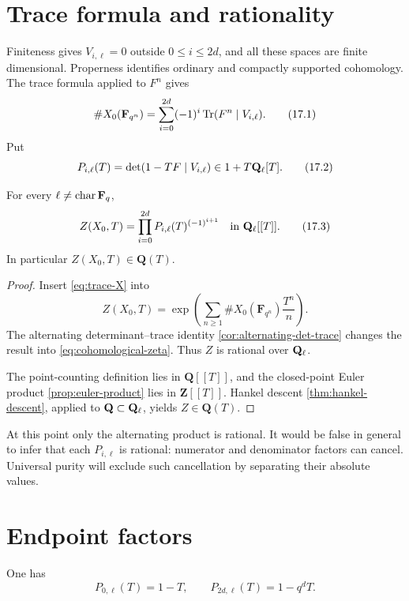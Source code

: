 \section{Trace formula and rationality}

Finiteness gives \(V_{i,\ell}=0\) outside \(0\leq i\leq2d\), and all these
spaces are finite dimensional.  Properness identifies ordinary and
compactly supported cohomology.  The trace formula applied to \(F^n\) gives
\[
  \#X_0(\mathbf F_{q^n})
  =
  \sum_{i=0}^{2d}(-1)^i
  \operatorname{Tr}(F^n\mid V_{i,\ell}).
\tag{17.1}\label{eq:trace-X}
\]
Put
\[
  P_{i,\ell}(T)=\det(1-TF\mid V_{i,\ell})
  \in1+T\mathbf Q_\ell[T].
\tag{17.2}\label{eq:Pi-definition}
\]

\begin{theorem}
\label{thm:cohomological-rationality}
For every \(\ell\ne\operatorname{char}\mathbf F_q\),
\[
  Z(X_0,T)
  =
  \prod_{i=0}^{2d}P_{i,\ell}(T)^{(-1)^{i+1}}
  \quad\text{in }\mathbf Q_\ell[[T]].
\tag{17.3}\label{eq:cohomological-zeta}
\]
In particular \(Z(X_0,T)\in\mathbf Q(T)\).
\end{theorem}

\begin{proof}
Insert \eqref{eq:trace-X} into
\[
 Z(X_0,T)=
 \exp\!\left(\sum_{n\geq1}
 \#X_0(\mathbf F_{q^n})\frac{T^n}{n}\right).
\]
The alternating determinant--trace identity
\cref{cor:alternating-det-trace} changes the result into
\eqref{eq:cohomological-zeta}.  Thus \(Z\) is rational over \(\mathbf Q_\ell\).

The point-counting definition lies in \(\mathbf Q[[T]]\), and the closed-point
Euler product \cref{prop:euler-product} lies in \(\mathbf Z[[T]]\).
Hankel descent \cref{thm:hankel-descent}, applied to
\(\mathbf Q\subset\mathbf Q_\ell\), yields \(Z\in\mathbf Q(T)\).
\end{proof}

\begin{warning}
At this point only the alternating product is rational.  It would be false in
general to infer that each \(P_{i,\ell}\) is rational: numerator and
denominator factors can cancel.  Universal purity will exclude such
cancellation by separating their absolute values.
\end{warning}

\section{Endpoint factors}

\begin{proposition}
\label{prop:endpoint-factors}
One has
\[
  P_{0,\ell}(T)=1-T,\qquad
  P_{2d,\ell}(T)=1-q^dT.
\tag{17.4}\label{eq:endpoint-factors}
\]
\end{proposition}

